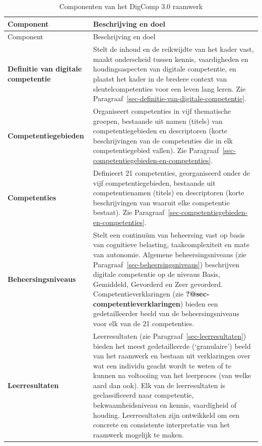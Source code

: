 \documentclass[
  dutch,
  letterpaper,
  DIV=11,
  numbers=noendperiod]{scrartcl}
\begin{document}
\begin{longtable}[]{@{}
  >{\raggedright\arraybackslash}p{}
  >{\raggedright\arraybackslash}p{}@{}}
\caption{Componenten van het DigComp 3.0
raamwerk}\label{tbl-componenten}\tabularnewline
\toprule\noalign{}
\begin{minipage}[b]{\linewidth}\raggedright
Component
\end{minipage} & \begin{minipage}[b]{\linewidth}\raggedright
Beschrijving en doel
\end{minipage} \\
\midrule\noalign{}
\endfirsthead
\toprule\noalign{}
\begin{minipage}[b]{\linewidth}\raggedright
Component
\end{minipage} & \begin{minipage}[b]{\linewidth}\raggedright
Beschrijving en doel
\end{minipage} \\
\midrule\noalign{}
\endhead
\bottomrule\noalign{}
\endlastfoot
\textbf{Definitie van digitale competentie} & Stelt de inhoud en de
reikwijdte van het kader vast, maakt onderscheid tussen kennis,
vaardigheden en houdingsaspecten van digitale competentie, en plaatst
het kader in de bredere context van sleutelcompetenties voor een leven
lang leren. Zie
Paragraaf~\ref{sec-definitie-van-digitale-competentie}. \\
\textbf{Competentiegebieden} & Organiseert competenties in vijf
thematische groepen, bestaande uit namen (titels) van
competentiegebieden en descriptoren (korte beschrijvingen van de
competenties die in elk competentiegebied vallen). Zie
Paragraaf~\ref{sec-competentiegebieden-en-competenties}. \\
\textbf{Competenties} & Definieert 21 competenties, georganiseerd onder
de vijf competentiegebieden, bestaande uit competentienamen (titels) en
descriptoren (korte beschrijvingen van waaruit elke competentie
bestaat). Zie
Paragraaf~\ref{sec-competentiegebieden-en-competenties}. \\
\textbf{Beheersingsniveaus} & Stelt een continuüm van beheersing vast op
basis van cognitieve belasting, taakcomplexiteit en mate van autonomie.
Algemene beheersingsniveaus (zie Paragraaf~\ref{sec-beheersingsniveaus})
beschrijven digitale competentie op de niveaus Basis, Gemiddeld,
Gevorderd en Zeer gevorderd. Competentieverklaringen (zie
\textbf{?@sec-competentieverklaringen}) bieden een gedetailleerder beeld
van de beheersingsniveaus voor elk van de 21 competenties. \\
\textbf{Leerresultaten} & Leerresultaten (zie
Paragraaf~\ref{sec-leerresultaten}) bieden het meest gedetailleerde
(`granulaire') beeld van het raamwerk en bestaan uit verklaringen over
wat een individu geacht wordt te weten of te kunnen na voltooiing van
het leerproces (van welke aard dan ook). Elk van de leerresultaten is
geclassificeerd naar competentie, bekwaamheidsniveau en kennis,
vaardigheid of houding. Leerresultaten zijn ontwikkeld om een concrete
en consistente interpretatie van het raamwerk mogelijk te maken. \\
\end{longtable}
\end{document}
